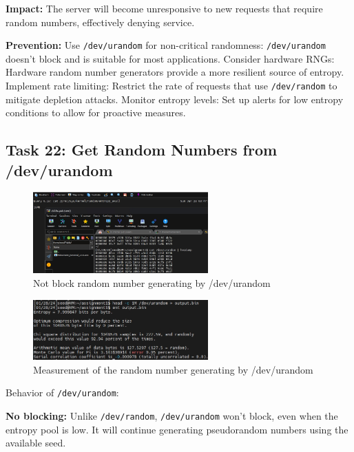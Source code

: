 \documentclass[a4paper,11pt]{article}
\begin{document}
\textbf{Impact:}
The server will become unresponsive to new requests that require random numbers, effectively denying service.

\textbf{Prevention:}
Use \verb|/dev/urandom| for non-critical randomness: \verb|/dev/urandom| doesn't block and is suitable for most applications.
Consider hardware RNGs: Hardware random number generators provide a more resilient source of entropy.
Implement rate limiting: Restrict the rate of requests that use \verb|/dev/random| to mitigate depletion attacks.
Monitor entropy levels: Set up alerts for low entropy conditions to allow for proactive measures.

\subsection{Task 22: Get Random Numbers from /dev/urandom}

\begin{figure}[h]
    \centering
       \includegraphics[width=0.6\textwidth]{figures/task22/watch1.png}
    \caption{Not block random number generating by /dev/urandom}\label{fig:task22observation-1}
\end{figure}

\begin{figure}[h]
    \centering
       \includegraphics[width=0.6\textwidth]{figures/task22/watch2.png}
    \caption{Measurement of the random number generating by /dev/urandom}\label{fig:task22observation-2}
\end{figure}

Behavior of \verb|/dev/urandom|:

\textbf{No blocking:} Unlike \verb|/dev/random|, \verb|/dev/urandom| won't block, even when the entropy pool is low. It will continue generating pseudorandom numbers using the available seed.
\end{document}
